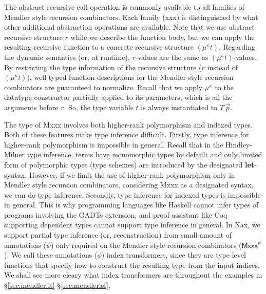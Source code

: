 The abstract recursive call operation is commonly available to
all families of Mendler style recursion combinators. Each family (\textsf{xxx})
is distinguished by what other additional abstraction operations are available.
Note that we use abstract recursive structure $r$ while we describe
the function body, but we can apply the resulting recursive function
to a concrete recursive structure $(\mu^\kappa t)$. Regarding the dynamic
semantics (or, at runtime), $r$-values are the same as $(\mu^\kappa t)$-values.
By restricting the type information of the recursive structure ($r$ instead of
$(\mu^\kappa t)$), well typed function descriptions for the Mendler style
recursion combinators are guaranteed to normalize. Recall that we apply
$\mu^\kappa$ to the datatype constructor partially applied to its parameters,
which is all the arguments before $r$. So, the type variable $t$ is always
instantiated to $T\,\vec{p}$.

The type of \textsf{Mxxx} involves both higher-rank polymorphism and
indexed types. Both of these features make type inference difficult.
Firstly, type inference for higher-rank polymorphism is impossible in general.
Recall that in the Hindley-Milner type inference, terms have monomorphic types
by default and only limited form of polymorphic types (type schemes) are
introduced by the designated \textbf{let}-syntax.  However, if we limit
the use of higher-rank polymorphism only in Mendler style recursion combinators,
considering \textsf{Mxxx} as a designated syntax, we can do type inference.
Secondly, type inference for indexed types is impossible in general.
This is why programming languages like Haskell cannot infer types of programs
involving the GADTs extension, and proof assistant like Coq supporting
dependent types cannot support type inference in general. In Nax, we support
partial type inference (or, reconstruction) from small amount of annotations
($\psi$) only required on the Mendler style recursion combinators
($\textsf{Mxxx}^\psi$). We call these annotations ($\phi$) index transformers,
since they are type level functions that specify how to construct
the resulting type from the input indices. We shall see more cleary
what index transformers are throughout the examples in
\S\ref{sec:mendler:it}-\S\ref{sec:mendler:sf}.

